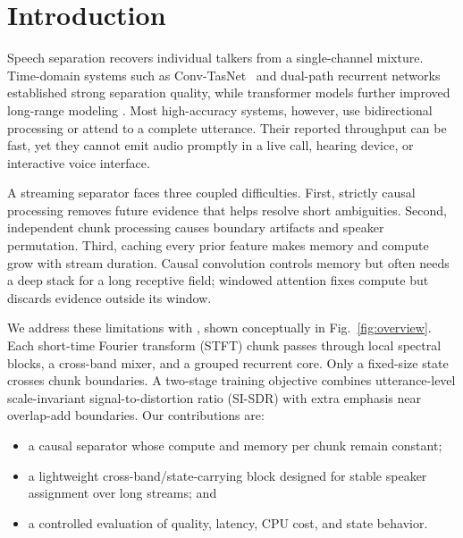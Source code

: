 \section{Introduction}
\label{sec:intro}

Speech separation recovers individual talkers from a single-channel mixture.
Time-domain systems such as Conv-TasNet~\cite{luo2019convtasnet} and dual-path
recurrent networks~\cite{luo2020dprnn} established strong separation quality,
while transformer models further improved long-range modeling
\cite{subakan2021sepformer}.  Most high-accuracy systems, however, use
bidirectional processing or attend to a complete utterance.  Their reported
throughput can be fast, yet they cannot emit audio promptly in a live call,
hearing device, or interactive voice interface.

A streaming separator faces three coupled difficulties.  First, strictly causal
processing removes future evidence that helps resolve short ambiguities.  Second,
independent chunk processing causes boundary artifacts and speaker permutation.
Third, caching every prior feature makes memory and compute grow with stream
duration.  Causal convolution controls memory but often needs a deep stack for a
long receptive field; windowed attention fixes compute but discards evidence
outside its window.

We address these limitations with \model, shown conceptually in
Fig.~\ref{fig:overview}.  Each short-time Fourier transform (STFT) chunk passes
through local spectral blocks, a cross-band mixer, and a grouped recurrent core.
Only a fixed-size state crosses chunk boundaries.  A two-stage training objective
combines utterance-level scale-invariant signal-to-distortion ratio (SI-SDR) with
extra emphasis near overlap-add boundaries.  Our contributions are:

\begin{itemize}
  \setlength{\itemsep}{0pt}
  \setlength{\topsep}{2pt}
  \setlength{\leftmargin}{1.25em}
  \item a causal separator whose compute and memory per chunk remain constant;
  \item a lightweight cross-band/state-carrying block designed for stable speaker
        assignment over long streams; and
  \item a controlled evaluation of quality, latency, CPU cost, and state behavior.
\end{itemize}

